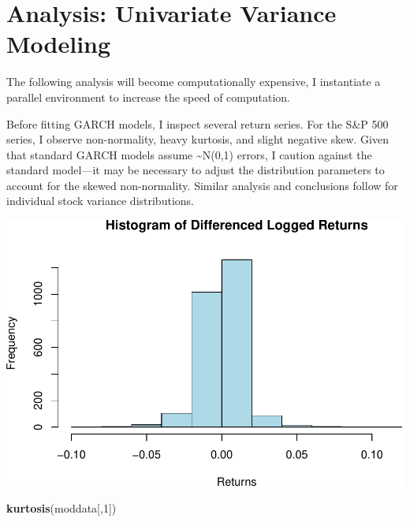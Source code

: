 \documentclass[]{elsarticle} %
\makeatletter
\newenvironment{Shaded}{\begin{snugshade}}{\end{snugshade}}
\newcommand{\KeywordTok}[1]{\textcolor[rgb]{0.13,0.29,0.53}{\textbf{{#1}}}}
\newcommand{\DataTypeTok}[1]{\textcolor[rgb]{0.13,0.29,0.53}{{#1}}}
\newcommand{\DecValTok}[1]{\textcolor[rgb]{0.00,0.00,0.81}{{#1}}}
\newcommand{\StringTok}[1]{\textcolor[rgb]{0.31,0.60,0.02}{{#1}}}
\newcommand{\NormalTok}[1]{{#1}}
\def\maxwidth{\ifdim\Gin@nat@width>\linewidth\linewidth
\else\Gin@nat@width\fi}
\let\Oldincludegraphics\includegraphics
\renewcommand{\includegraphics}[1]{\Oldincludegraphics[width=\maxwidth]{#1}}
\makeatother
\begin{document}
\section{Analysis: Univariate Variance
Modeling}\label{analysis-univariate-variance-modeling}

The following analysis will become computationally expensive, I
instantiate a parallel environment to increase the speed of computation.

\begin{Shaded}
\end{Shaded}

Before fitting GARCH models, I inspect several return series. For the
S\&P 500 series, I observe non-normality, heavy kurtosis, and slight
negative skew. Given that standard GARCH models assume
\textasciitilde{}N(0,1) errors, I caution against the standard
model---it may be necessary to adjust the distribution parameters to
account for the skewed non-normality. Similar analysis and conclusions
follow for individual stock variance distributions.

\includegraphics{report_files/figure-latex/analysis11-1.pdf}

\begin{Shaded}
\begin{Highlighting}[]
\KeywordTok{kurtosis}\NormalTok{(moddata[,}\DecValTok{1}\NormalTok{])}
\end{Highlighting}
\end{Shaded}
\end{document}
